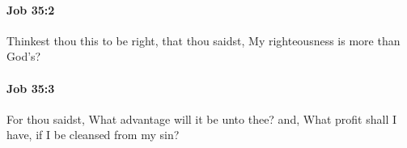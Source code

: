 		\paragraph{Job 35:2} %
			\label{JOB-35-2}

			Thinkest thou this to be right, that thou saidst, My righteousness is more than God’s?


		\paragraph{Job 35:3} %
			\label{JOB-35-3}

			For thou saidst, What advantage will it be unto thee? and, What profit shall I have, if I be cleansed from my sin?



